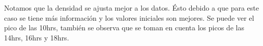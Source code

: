 Notamos que la densidad se ajusta mejor a los datos. Ésto debido a que para este caso se tiene más información y los valores iniciales son mejores. Se puede ver el pico de las 10hrs, también se observa que se toman en cuenta los picos de las 14hrs, 16hrs y 18hrs.

